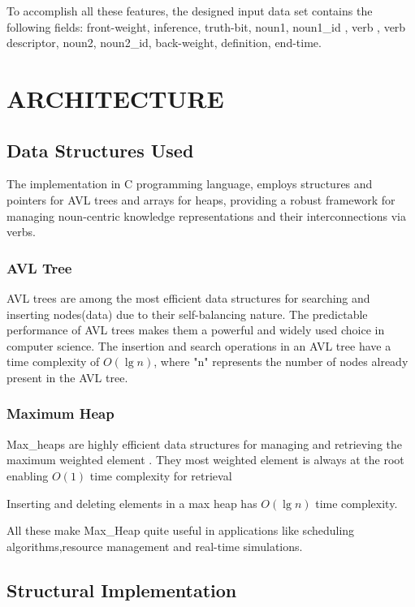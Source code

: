 \documentclass[conference]{IEEEtran}
\begin{document}
To accomplish all these features, the designed input data set contains the following fields: front-weight, inference, truth-bit, noun1, noun1\_id , verb , verb descriptor, noun2, noun2\_id, back-weight, definition, end-time.




\section{ARCHITECTURE}

\subsection{\textbf{Data Structures Used}}
The implementation in C programming language\cite{b9}, employs structures and pointers for AVL trees and arrays for heaps, providing a robust framework for managing noun-centric knowledge representations and their interconnections via verbs.

\subsubsection{\textbf{AVL Tree}}

AVL trees\cite{b14} are among the most efficient data structures for searching and inserting nodes(data) due to their 
self-balancing nature. The predictable performance of AVL trees makes 
them a powerful and widely used choice in computer 
science.
The insertion and search operations in an AVL tree have a time complexity of $O(\lg n)$, 
where "n" represents the number of nodes already present in the AVL tree.


\subsubsection{\textbf{Maximum Heap}}

Max\_heaps\cite{b14} are highly efficient data structures for managing and retrieving the maximum weighted element . 
They most weighted element is always at the root enabling $O(1)$ time complexity for retrieval

Inserting and deleting elements in a max heap has $O(\lg n)$ time complexity.

All these make Max\_Heap quite useful in applications like scheduling algorithms,resource management 
and real-time simulations.


\subsection{\textbf{Structural Implementation}}
\end{document}
